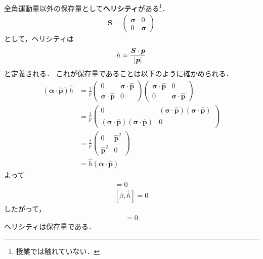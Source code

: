 \documentclass{report}
\begin{document}
  全角運動量以外の保存量として\textbf{ヘリシティ}がある\footnote{授業では触れていない．}．
  \begin{align}
    \bm{\bm{S}} = 
    \begin{pmatrix}
      \bm{\sigma} & 0\\
      0 & \bm{\sigma}
    \end{pmatrix}
  \end{align}
  として，ヘリシティは
  \begin{align}
    h = \frac{\bm{\bm{S}} \cdot \bm{p}}{\abs{\bm{p}}}
  \end{align}
  と定義される．
  これが保存量であることは以下のように確かめられる．
  \begin{align}
    (\bm{\alpha} \cdot \hat{\bm{p}}) \hat{h} &= \frac{1}{p}
    \begin{pmatrix}
      0 & \bm{\sigma} \cdot \hat{\bm{p}}\\
      \bm{\sigma} \cdot \hat{\bm{p}} & 0
    \end{pmatrix}
    \begin{pmatrix}
      \bm{\sigma} \cdot \hat{\bm{p}} & 0\\
      0 & \bm{\sigma} \cdot \hat{\bm{p}}
    \end{pmatrix}\\
    &= \frac{1}{p}
    \begin{pmatrix}
      0 & (\bm{\sigma} \cdot \hat{\bm{p}})(\bm{\sigma} \cdot \hat{\bm{p}})\\
      (\bm{\sigma} \cdot \hat{\bm{p}})(\bm{\sigma} \cdot \hat{\bm{p}}) & 0
    \end{pmatrix}\\
    &=\frac{1}{p}
    \begin{pmatrix}
      0 & \hat{\bm{p}}^2\\
      \hat{\bm{p}}^2 & 0
    \end{pmatrix}\\
    &= \hat{h}(\bm{\alpha}\cdot \hat{\bm{p}})
  \end{align}
  よって
  \begin{align}
    [\bm{\alpha} \cdot \hat{\bm{p}}, \hat{h}] = 0\\
    [\beta, \hat{h}] = 0
  \end{align}
  したがって，
  \begin{align}
    [\hat{H}, \hat{h}] = 0
  \end{align}
  ヘリシティは保存量である．
\end{document}
